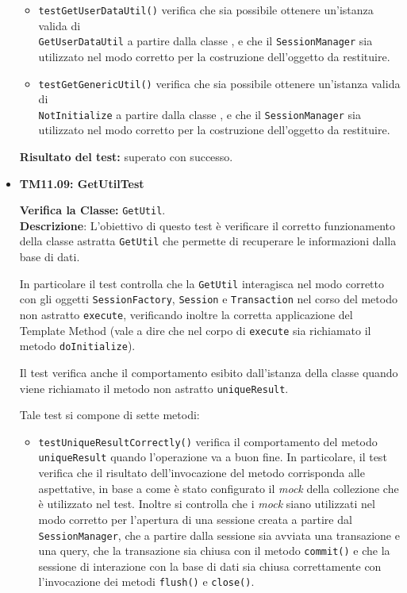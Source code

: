 \begin{itemize}
\begin{itemize}
\item \texttt{testGetUserDataUtil()} verifica che sia possibile ottenere un'istanza valida di \\ \texttt{GetUserDataUtil} a partire dalla classe , e che il \texttt{SessionManager} sia utilizzato nel modo corretto per la costruzione dell'oggetto da restituire.

\item \texttt{testGetGenericUtil()} verifica che sia possibile ottenere un'istanza valida di \\ \texttt{NotInitialize} a partire dalla classe , e che il \texttt{SessionManager} sia utilizzato nel modo corretto per la costruzione dell'oggetto da restituire.

\end{itemize}
\textbf{Risultato del test:} superato con successo.

\item \textbf{TM11.09: GetUtilTest} 

\textbf{Verifica la Classe:} \texttt{GetUtil}.\\
\textbf{Descrizione}: L'obiettivo di questo test è verificare il corretto funzionamento della classe astratta \texttt{GetUtil} che permette di recuperare le informazioni dalla base di dati.

In particolare il test controlla che la \texttt{GetUtil} interagisca nel modo corretto con gli oggetti \texttt{SessionFactory}, \texttt{Session} e \texttt{Transaction} nel corso del metodo non astratto \texttt{execute}, verificando inoltre la corretta applicazione del  Template Method (vale a dire che nel corpo di \texttt{execute} sia richiamato il metodo \texttt{doInitialize}).

Il test verifica anche il comportamento esibito dall'istanza della classe quando viene richiamato il metodo non astratto \texttt{uniqueResult}.

Tale test si compone di sette metodi:
\begin{itemize}
\item \texttt{testUniqueResultCorrectly()} verifica il comportamento del metodo \texttt{uniqueResult} quando l'operazione va a buon fine. In particolare, il test verifica che il risultato dell'invocazione del metodo corrisponda alle aspettative, in base a come è stato configurato il \textit{mock} della collezione che è utilizzato nel test.
Inoltre si controlla che i \textit{mock} siano utilizzati nel modo corretto per l'apertura di una sessione creata a partire dal \texttt{SessionManager}, che a partire dalla sessione sia avviata una transazione e una query, che la transazione sia chiusa con il metodo \texttt{commit()} e che la sessione di interazione con la base di dati sia chiusa correttamente con l'invocazione dei metodi \texttt{flush()} e \texttt{close()}. 


\end{itemize}
\end{itemize}
